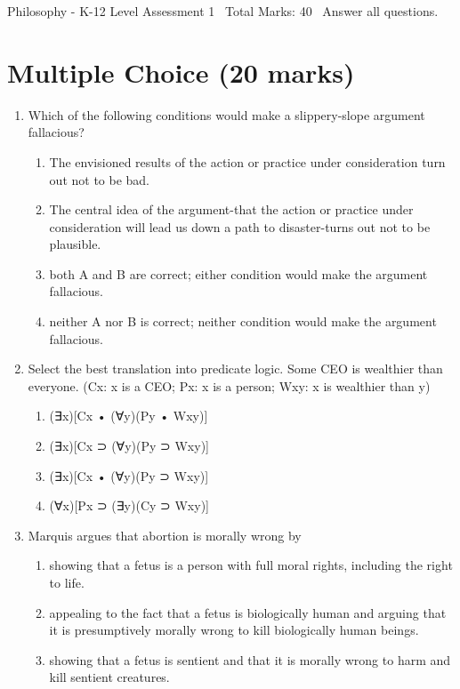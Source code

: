 \documentclass[12pt]{article}
\begin{document}
\begin{center}
Philosophy - K-12 Level Assessment 1 \
Total Marks: 40 \
Answer all questions.
\end{center}

\section*{Multiple Choice (20 marks)}
\begin{enumerate}[label=\arabic*.]
\item Which of the following conditions would make a slippery-slope argument fallacious?
\begin{enumerate}[label=(\alph*)]
    \item The envisioned results of the action or practice under consideration turn out not to be bad.
    \item The central idea of the argument-that the action or practice under consideration will lead us down a path to disaster-turns out not to be plausible.
    \item both A and B are correct; either condition would make the argument fallacious.
    \item neither A nor B is correct; neither condition would make the argument fallacious.
\end{enumerate}
\item Select the best translation into predicate logic. Some CEO is wealthier than everyone. (Cx: x is a CEO; Px: x is a person; Wxy: x is wealthier than y)
\begin{enumerate}[label=(\alph*)]
    \item (∃x)[Cx • (∀y)(Py • Wxy)]
    \item (∃x)[Cx ⊃ (∀y)(Py ⊃ Wxy)]
    \item (∃x)[Cx • (∀y)(Py ⊃ Wxy)]
    \item (∀x)[Px ⊃ (∃y)(Cy ⊃ Wxy)]
\end{enumerate}
\item Marquis argues that abortion is morally wrong by
\begin{enumerate}[label=(\alph*)]
    \item showing that a fetus is a person with full moral rights, including the right to life.
    \item appealing to the fact that a fetus is biologically human and arguing that it is presumptively morally wrong to kill biologically human beings.
    \item showing that a fetus is sentient and that it is morally wrong to harm and kill sentient creatures.

\end{enumerate}
\end{enumerate}
\end{document}
